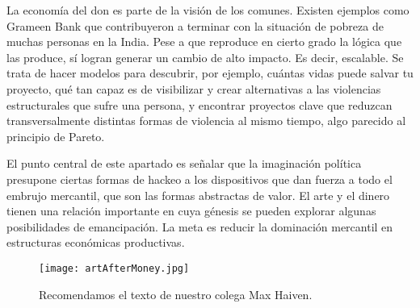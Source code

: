 La economía del don es parte de la visión de los comunes. Existen ejemplos como Grameen Bank que contribuyeron a terminar con la situación de pobreza de muchas personas en la India. Pese a que reproduce en cierto grado la lógica que las produce, sí logran generar un cambio de alto impacto. Es decir, escalable. Se trata de hacer modelos para descubrir, por ejemplo, cuántas vidas puede salvar tu proyecto, qué tan capaz es de visibilizar y crear alternativas a las violencias estructurales que sufre una persona, y encontrar proyectos clave que reduzcan transversalmente distintas formas de violencia al mismo tiempo, algo parecido al principio de Pareto.

El punto central de este apartado es señalar que la imaginación política presupone ciertas formas de hackeo a los dispositivos que dan fuerza a todo el embrujo mercantil, que son las formas abstractas de valor. El arte y el dinero tienen una relación importante en cuya génesis se pueden explorar algunas posibilidades de emancipación. La meta es reducir la dominación mercantil en estructuras económicas productivas.

\begin{figure}[htbp]
	\centering
	\texttt{[image: artAfterMoney.jpg]}
	\caption[Recomendamos el texto de Max Haiven.]{Recomendamos el texto de nuestro colega Max Haiven.}
	\label{fig:Haiven}
\end{figure}
